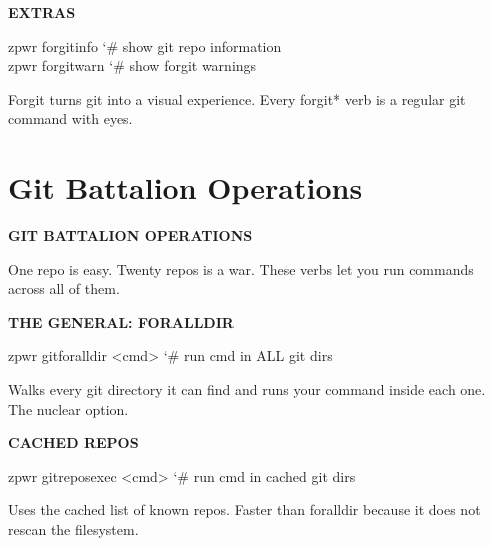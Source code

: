 \documentclass[11pt,a4paper,twoside]{book}
\begin{document}
\vspace{12pt}
{\bfseries\color{neonyellow} EXTRAS}\vspace{4pt}

\begin{codebox}
\color{neongreen}zpwr forgitinfo           {\char`\#} show git repo information\\
\color{neongreen}zpwr forgitwarn           {\char`\#} show forgit warnings\\
\end{codebox}

Forgit turns git into a visual experience. Every forgit* verb is a regular git command with eyes.


\vspace{16pt}

\section{Git Battalion Operations}


\vspace{10pt}
{\large\bfseries\color{neoncyan} GIT BATTALION OPERATIONS}\vspace{6pt}

One repo is easy. Twenty repos is a war. These verbs let you run commands across all of them.


\vspace{12pt}
{\bfseries\color{neonyellow} THE GENERAL: FORALLDIR}\vspace{4pt}

\begin{codebox}
\color{neongreen}zpwr gitforalldir <cmd>   {\char`\#} run cmd in ALL git dirs\\
\end{codebox}

Walks every git directory it can find and runs your command inside each one. The nuclear option.


\vspace{12pt}
{\bfseries\color{neonyellow} CACHED REPOS}\vspace{4pt}

\begin{codebox}
\color{neongreen}zpwr gitreposexec <cmd>    {\char`\#} run cmd in cached git dirs\\
\end{codebox}

Uses the cached list of known repos. Faster than foralldir because it does not rescan the filesystem.
\end{document}
